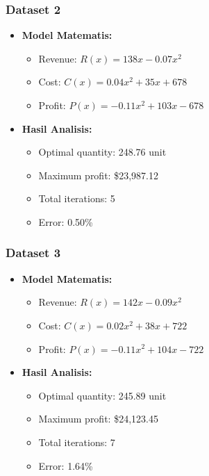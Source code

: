 \documentclass[conference]{IEEEtran}
\begin{document}
\subsubsection{Dataset 2}
\begin{itemize}
\item \textbf{Model Matematis:}
\begin{itemize}
\item Revenue: $R(x) = 138x - 0.07x^2$
\item Cost: $C(x) = 0.04x^2 + 35x + 678$
\item Profit: $P(x) = -0.11x^2 + 103x - 678$
\end{itemize}
\item \textbf{Hasil Analisis:}
\begin{itemize}
\item Optimal quantity: 248.76 unit
\item Maximum profit: \$23,987.12
\item Total iterations: 5
\item Error: 0.50\%
\end{itemize}
\end{itemize}

\subsubsection{Dataset 3}
\begin{itemize}
\item \textbf{Model Matematis:}
\begin{itemize}
\item Revenue: $R(x) = 142x - 0.09x^2$
\item Cost: $C(x) = 0.02x^2 + 38x + 722$
\item Profit: $P(x) = -0.11x^2 + 104x - 722$
\end{itemize}
\item \textbf{Hasil Analisis:}
\begin{itemize}
\item Optimal quantity: 245.89 unit
\item Maximum profit: \$24,123.45
\item Total iterations: 7
\item Error: 1.64\%
\end{itemize}
\end{itemize}
\end{document}
